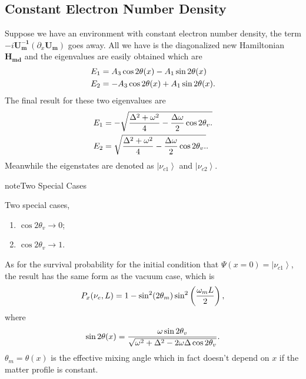 \documentclass[letterpaper,12pt,english]{sphinxmanual}
\newcommand{\ket}[1]{\left| #1\right\rangle}
\begin{document}
\subsection{Constant Electron Number Density}
\label{msw:constant-electron-number-density}
Suppose we have an environment with constant electron number density, the term \(- i \mathbf{U_m^{-1}} ( \partial_x \mathbf{U_m} )\) goes away. All we have is the diagonalized new Hamiltonian \(\mathbf{H_{md}}\) and the eigenvalues are easily obtained which are
\begin{gather}
\begin{split}E_1 &= A_3\cos 2\theta(x) - A_1 \sin 2\theta(x) \\
E_2 & = - A_3 \cos 2\theta(x) + A_1 \sin 2\theta(x) .\end{split}\notag
\end{gather}
The final result for these two eigenvalues are
\begin{gather}
\begin{split}E_1 &= -\sqrt{ \frac{\Delta^2 + \omega^2 }{4} - \frac{\Delta \omega }{2} \cos 2\theta_v. } \\
E_2 &= \sqrt{ \frac{\Delta^2 + \omega^2 }{4} - \frac{\Delta \omega }{2} \cos 2\theta_v. }.\end{split}\notag
\end{gather}
Meanwhile the eigenstates are denoted as \(\ket{\nu_{c1}}\) and \(\ket{\nu_{c2}}\).

\begin{notice}{note}{Two Special Cases}

Two special cases,
\begin{enumerate}
\item {} 
\(\cos 2\theta_v \to 0\);

\item {} 
\(\cos 2\theta_v \to 1\).

\end{enumerate}
\end{notice}

As for the survival probability for the initial condition that \(\Psi(x=0)=\ket{\nu_{c1}}\), the result has the same form as the vacuum case, which is
\begin{gather}
\begin{split}P_x(\nu_e,L) = 1 - \sin^2(2\theta_m)\sin^2\left( \frac{\omega_m L}{2} \right) ,\end{split}\notag
\end{gather}
where
\begin{gather}
\begin{split}\sin 2\theta(x)  = \frac{\omega\sin 2\theta_v}{\sqrt{ \omega^2+\Delta^2 - 2 \omega \Delta\cos 2\theta_v }}.\end{split}\notag
\end{gather}
\(\theta_m = \theta(x)\) is the effective mixing angle which in fact doesn't depend on \(x\) if the matter profile is constant.
\end{document}
